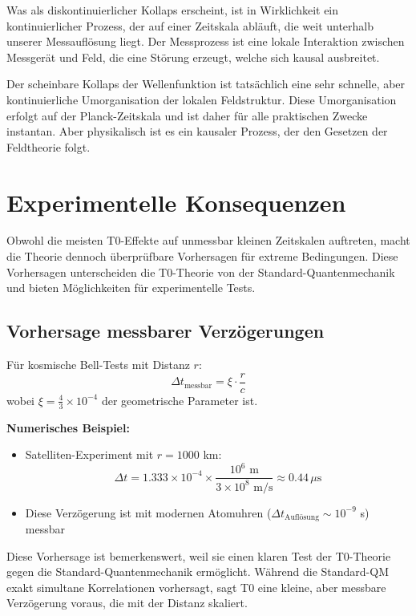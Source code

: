 \documentclass[12pt,a4paper]{article}
\begin{document}
	Was als diskontinuierlicher Kollaps erscheint, ist in Wirklichkeit ein kontinuierlicher Prozess, der auf einer Zeitskala abläuft, die weit unterhalb unserer Messauflösung liegt. Der Messprozess ist eine lokale Interaktion zwischen Messgerät und Feld, die eine Störung erzeugt, welche sich kausal ausbreitet.
	
	Der scheinbare Kollaps der Wellenfunktion ist tatsächlich eine sehr schnelle, aber kontinuierliche Umorganisation der lokalen Feldstruktur. Diese Umorganisation erfolgt auf der Planck-Zeitskala und ist daher für alle praktischen Zwecke instantan. Aber physikalisch ist es ein kausaler Prozess, der den Gesetzen der Feldtheorie folgt.
	
	\section{Experimentelle Konsequenzen}
	
	Obwohl die meisten T0-Effekte auf unmessbar kleinen Zeitskalen auftreten, macht die Theorie dennoch überprüfbare Vorhersagen für extreme Bedingungen. Diese Vorhersagen unterscheiden die T0-Theorie von der Standard-Quantenmechanik und bieten Möglichkeiten für experimentelle Tests.
	
	\subsection{Vorhersage messbarer Verzögerungen}
	
	Für kosmische Bell-Tests mit Distanz $r$:
	\begin{equation}
		\Delta t_{\text{messbar}} = \xi \cdot \frac{r}{c}
	\end{equation}
	wobei $\xi = \frac{4}{3} \times 10^{-4}$ der geometrische Parameter ist.
	
	\textbf{Numerisches Beispiel:}
	\begin{itemize}
		\item Satelliten-Experiment mit $r = 1000$ km:
		\begin{equation}
			\Delta t = 1.333 \times 10^{-4} \times \frac{10^6 \text{ m}}{3 \times 10^8 \text{ m/s}} \approx 0.44 \, \mu\text{s}
		\end{equation}
		\item Diese Verzögerung ist mit modernen Atomuhren ($\Delta t_{\text{Auflösung}} \sim 10^{-9}$ s) messbar
	\end{itemize}
	
	Diese Vorhersage ist bemerkenswert, weil sie einen klaren Test der T0-Theorie gegen die Standard-Quantenmechanik ermöglicht. Während die Standard-QM exakt simultane Korrelationen vorhersagt, sagt T0 eine kleine, aber messbare Verzögerung voraus, die mit der Distanz skaliert.
	
\end{document}
